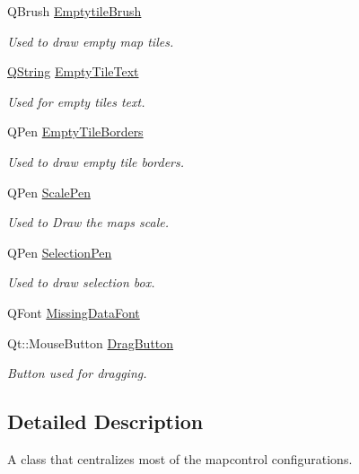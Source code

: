 \begin{DoxyCompactItemize}
\item 
\-Q\-Brush \hyperlink{group___o_p_map_widget_gad6bf957803f87dacf49bbff6998c72b6}{\-Emptytile\-Brush}
\begin{DoxyCompactList}\small\item\em \-Used to draw empty map tiles. \end{DoxyCompactList}\item 
\hyperlink{group___u_a_v_objects_plugin_gab9d252f49c333c94a72f97ce3105a32d}{\-Q\-String} \hyperlink{group___o_p_map_widget_ga3cee2f55adac9ad6424d5ea36a1fec54}{\-Empty\-Tile\-Text}
\begin{DoxyCompactList}\small\item\em \-Used for empty tiles text. \end{DoxyCompactList}\item 
\-Q\-Pen \hyperlink{group___o_p_map_widget_gae8db48d6cb03fedba7aa82d206dc82eb}{\-Empty\-Tile\-Borders}
\begin{DoxyCompactList}\small\item\em \-Used to draw empty tile borders. \end{DoxyCompactList}\item 
\-Q\-Pen \hyperlink{group___o_p_map_widget_gab4e66a6217ae69c3344a0af8578f5932}{\-Scale\-Pen}
\begin{DoxyCompactList}\small\item\em \-Used to \-Draw the maps scale. \end{DoxyCompactList}\item 
\-Q\-Pen \hyperlink{group___o_p_map_widget_gab3ccb3d980f16de07166bad27b8ff4dc}{\-Selection\-Pen}
\begin{DoxyCompactList}\small\item\em \-Used to draw selection box. \end{DoxyCompactList}\item 
\-Q\-Font \hyperlink{group___o_p_map_widget_gacaef660cdedd3dc5c76abc6f6872b149}{\-Missing\-Data\-Font}
\item 
\-Qt\-::\-Mouse\-Button \hyperlink{group___o_p_map_widget_ga18190e2acae7a12ba6b598cf25244acf}{\-Drag\-Button}
\begin{DoxyCompactList}\small\item\em \-Button used for dragging. \end{DoxyCompactList}\end{DoxyCompactItemize}


\subsection{\-Detailed \-Description}
\-A class that centralizes most of the mapcontrol configurations. 

